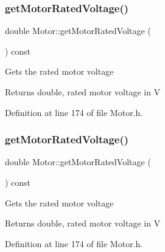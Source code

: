 \mbox{\label{class_motor_a3fedfc960a6970508b39999c58d44cc6}} 
\subsubsection{\texorpdfstring{get\+Motor\+Rated\+Voltage()}{getMotorRatedVoltage()}\hspace{0.1cm}{\footnotesize\ttfamily [1/3]}}
{\footnotesize\ttfamily double Motor\+::get\+Motor\+Rated\+Voltage (\begin{DoxyParamCaption}{ }\end{DoxyParamCaption}) const\hspace{0.3cm}{\ttfamily [inline]}}

Gets the rated motor voltage

\begin{DoxyReturn}{Returns}
double, rated motor voltage in V 
\end{DoxyReturn}


Definition at line 174 of file Motor.\+h.

\mbox{\label{class_motor_a3fedfc960a6970508b39999c58d44cc6}} 
\subsubsection{\texorpdfstring{get\+Motor\+Rated\+Voltage()}{getMotorRatedVoltage()}\hspace{0.1cm}{\footnotesize\ttfamily [2/3]}}
{\footnotesize\ttfamily double Motor\+::get\+Motor\+Rated\+Voltage (\begin{DoxyParamCaption}{ }\end{DoxyParamCaption}) const\hspace{0.3cm}{\ttfamily [inline]}}

Gets the rated motor voltage

\begin{DoxyReturn}{Returns}
double, rated motor voltage in V 
\end{DoxyReturn}


Definition at line 174 of file Motor.\+h.

\mbox{\label{class_motor_a3fedfc960a6970508b39999c58d44cc6}} 
